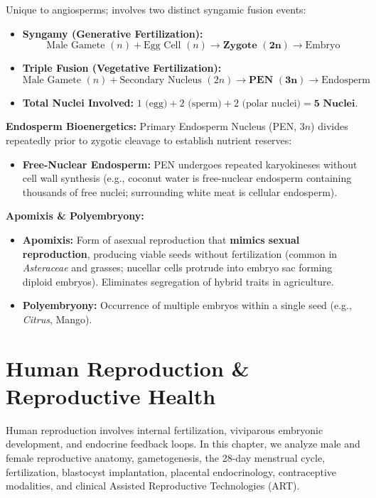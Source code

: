 \documentclass[10pt,twoside,openright]{book}
\begin{document}
\begin{formulabox}
Unique to angiosperms; involves two distinct syngamic fusion events:
\begin{itemize}[leftmargin=*]
  \item \textbf{Syngamy (Generative Fertilization):}
  \[
    \text{Male Gamete }(n) + \text{Egg Cell }(n) \longrightarrow \mathbf{\text{Zygote }(2n)} \longrightarrow \text{Embryo}
  \]
  \item \textbf{Triple Fusion (Vegetative Fertilization):}
  \[
    \text{Male Gamete }(n) + \text{Secondary Nucleus }(2n) \longrightarrow \mathbf{\text{PEN }(3n)} \longrightarrow \text{Endosperm}
  \]
  \item \textbf{Total Nuclei Involved:} $1\text{ (egg)} + 2\text{ (sperm)} + 2\text{ (polar nuclei)} = \mathbf{5\text{ Nuclei}}$.
\end{itemize}
\textbf{Endosperm Bioenergetics:} Primary Endosperm Nucleus (PEN, $3n$) divides repeatedly prior to zygotic cleavage to establish nutrient reserves:
\begin{itemize}
  \item \textbf{Free-Nuclear Endosperm:} PEN undergoes repeated karyokineses without cell wall synthesis (e.g., coconut water is free-nuclear endosperm containing thousands of free nuclei; surrounding white meat is cellular endosperm).
\end{itemize}
\textbf{Apomixis \& Polyembryony:}
\begin{itemize}
  \item \textbf{Apomixis:} Form of asexual reproduction that \textbf{mimics sexual reproduction}, producing viable seeds without fertilization (common in \textit{Asteraceae} and grasses; nucellar cells protrude into embryo sac forming diploid embryos). Eliminates segregation of hybrid traits in agriculture.
  \item \textbf{Polyembryony:} Occurrence of multiple embryos within a single seed (e.g., \textit{Citrus}, Mango).
\end{itemize}
\end{formulabox}

\chapter{Human Reproduction \& Reproductive Health}

Human reproduction involves internal fertilization, viviparous embryonic development, and endocrine feedback loops. In this chapter, we analyze male and female reproductive anatomy, gametogenesis, the 28-day menstrual cycle, fertilization, blastocyst implantation, placental endocrinology, contraceptive modalities, and clinical Assisted Reproductive Technologies (ART).
\end{document}
